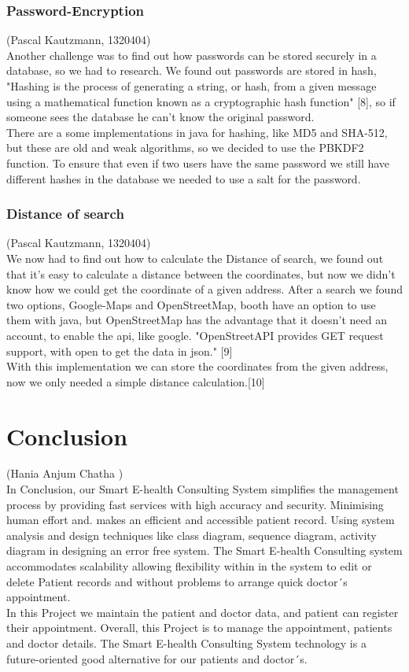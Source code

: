 \documentclass[a4paper, 12pt]{report}
\begin{document}
\subsection{Password-Encryption}
{\tiny (Pascal Kautzmann, 1320404)\\}
Another challenge was to find out how passwords can be stored securely in a database, so we had to research. We found out passwords are stored in hash, "Hashing is the process of generating a string, or hash, from a given message using a mathematical function known as a cryptographic hash function" [8], so if someone sees the database he can't know the original password. \\
There are a some implementations in java for hashing, like MD5 and SHA-512, but these are old and weak algorithms, so we decided to use the PBKDF2 function. To ensure that even if two users have the same password we still have different hashes in the database we needed to use a salt for the password.


\subsection{Distance of search}
{\tiny (Pascal Kautzmann, 1320404)\\}
We now had to find out how to calculate the Distance of search, we found out that it's easy to calculate a distance between the coordinates, but now we didn't know how we could get the coordinate of a given address. After a search we found two options, Google-Maps and OpenStreetMap, booth have an option to use them with java, but OpenStreetMap has the advantage
that it doesn't need an account, to enable the api, like google. "OpenStreetAPI provides GET request support, with open to get the data in json." [9]\\
With this implementation we can store the coordinates from the given address, now we only needed a simple distance calculation.[10] 
 

\chapter{Conclusion}
{\tiny (Hania Anjum Chatha )\\}
In Conclusion, our Smart E-health Consulting System simplifies the management process by providing fast services with high accuracy and security. Minimising human effort and. makes an efficient and accessible patient record. Using system analysis and design techniques like class diagram, sequence diagram, activity diagram in designing an error free system. The Smart E-health Consulting system accommodates scalability allowing flexibility within in the system to edit or delete Patient records and without problems to arrange quick doctor´s appointment. \\
In this Project we maintain the patient and doctor data, and patient can register their appointment. Overall, this Project is to manage the appointment, patients and doctor details. The Smart E-health Consulting System technology is a future-oriented good alternative for our patients and doctor´s.
\end{document}
